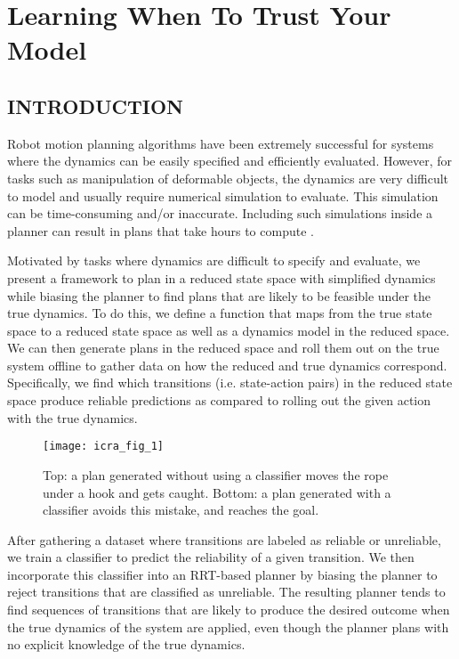 \chapter{Learning When To Trust Your Model}
\label{chap:learning_when_to_trust}



\section{INTRODUCTION}

Robot motion planning algorithms have been extremely successful for systems where the dynamics can be easily specified and efficiently evaluated. However, for tasks such as manipulation of deformable objects, the dynamics are very difficult to model \cite{Essahbi2012} and usually require numerical simulation to evaluate. This simulation can be time-consuming and/or inaccurate. Including such simulations inside a planner can result in plans that take hours to compute \cite{Bai2016}.

Motivated by tasks where dynamics are difficult to specify and evaluate, we present a framework to plan in a reduced state space with simplified dynamics while biasing the planner to find plans that are likely to be feasible under the true dynamics. To do this, we define a function that maps from the true state space to a reduced state space as well as a dynamics model in the reduced space. We can then generate plans in the reduced space and roll them out on the true system offline to gather data on how the reduced and true dynamics correspond. Specifically, we find which transitions (i.e. state-action pairs) in the reduced state space produce reliable predictions as compared to rolling out the given action with the true dynamics. 

\begin{figure}[t]
    \centering
    \texttt{[image: icra\_fig\_1]}
    \caption{Top: a plan generated without using a classifier moves the rope under a hook and gets caught. Bottom: a plan generated with a classifier avoids this mistake, and reaches the goal.}
    \label{fig:intro_figure}
    \vspace{-0.15in}
\end{figure}

After gathering a dataset where transitions are labeled as reliable or unreliable, we train a classifier to predict the reliability of a given transition. We then incorporate this classifier into an RRT-based planner by biasing the planner to reject transitions that are classified as unreliable. The resulting planner tends to find sequences of transitions that are likely to produce the desired outcome when the true dynamics of the system are applied, even though the planner plans with no explicit knowledge of the true dynamics.

